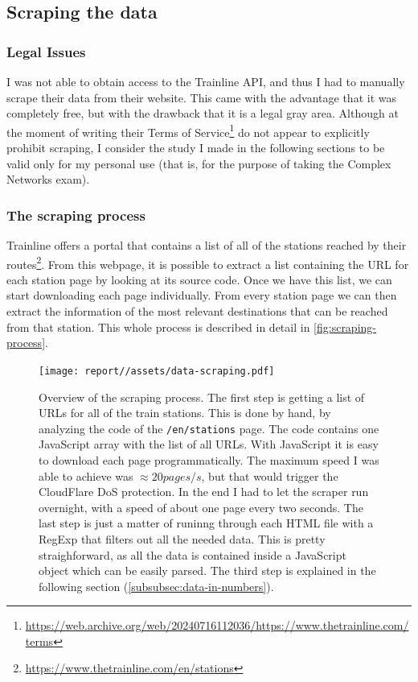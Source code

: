 \subsection{Scraping the data}
\subsubsection{Legal Issues}
I was not able to obtain access to the Trainline API, and thus I had to manually scrape their data from their website. This came with the advantage that it was completely free, but with the drawback that it is a legal gray area. Although at the moment of writing their Terms of Service\footnote{\url{https://web.archive.org/web/20240716112036/https://www.thetrainline.com/terms}} do not appear to explicitly prohibit scraping, I consider the study I made in the following sections to be valid only for my personal use (that is, for the purpose of taking the Complex Networks exam).

\subsubsection{The scraping process}
Trainline offers a portal that contains a list of all of the stations reached by their routes\footnote{\url{https://www.thetrainline.com/en/stations}}.
From this webpage, it is possible to extract a list containing the URL for each station page by looking at its source code. Once we have this list, we can start downloading each page individually.
From every station page we can then extract the information of the most relevant destinations that can be reached from that station.
This whole process is described in detail in \autoref{fig:scraping-process}.

\begin{figure}
    \centering
    \texttt{[image: report//assets/data-scraping.pdf]}
    \cprotect\caption{Overview of the scraping process. The first step is getting a list of URLs for all of the train stations. This is done by hand, by analyzing the code of the \verb|/en/stations| page. The code contains one JavaScript array with the list of all URLs. With JavaScript it is easy to download each page programmatically. The maximum speed I was able to achieve was $\approx 20pages/s$, but that would trigger the CloudFlare DoS protection. In the end I had to let the scraper run overnight, with a speed of about one page every two seconds. The last step is just a matter of runinng through each HTML file with a RegExp that filters out all the needed data. This is pretty straighforward, as all the data is contained inside a JavaScript object which can be easily parsed. The third step is explained in the following section (\ref{subsubsec:data-in-numbers}).}
    \label{fig:scraping-process}
\end{figure}


